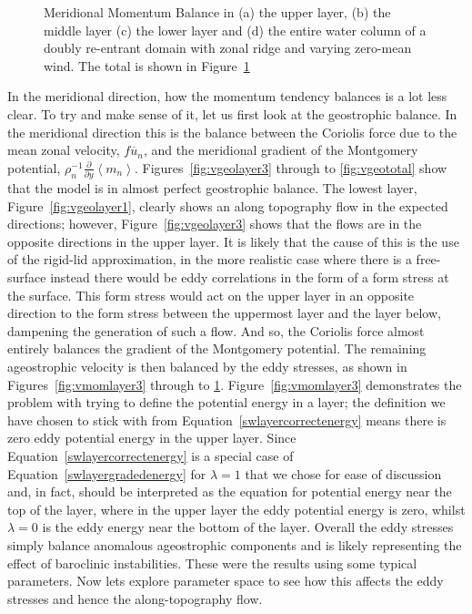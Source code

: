 \documentclass[12pt,a4paper]{report}
\newcommand*\thkmean[1]{\overline{#1}}
\newcommand*\nthkmean[1]{\left\langle{#1}\right\rangle}
\newcommand*\figref[1]{Figure~\ref{#1}}
\newcommand*\equref[1]{Equation~\eqref{#1}}
\newcommand*{\partialdiff}[2][{}]{\frac{\partial #1}{\partial #2}}
\begin{document}
\begin{figure}
\begin{subfigure}{0.48\linewidth}
 		\label{fig:vmomtotal}
 	\end{subfigure}
 	\caption{Meridional Momentum Balance in (a) the upper layer, (b) the middle layer
 		(c) the lower layer and (d) the entire water column of 
 		a doubly re-entrant domain with 
 		zonal ridge and varying zero-mean wind. The total is shown in
 		\figref{fig:vmomtotal}}
 	\label{fig:vmom}
 \end{figure}
 
 In the meridional direction, how the momentum tendency balances is a lot
 less clear. To try and make sense of it, let us first look at
 the geostrophic balance. In the meridional direction this
 is the balance between the Coriolis force due to the mean zonal velocity,
 $f\thkmean{u}_{n}$,
 and the meridional gradient of the Montgomery potential,
 $\rho_{n}^{-1}\partialdiff{y}\nthkmean{m_{n}}$. Figures~\ref{fig:vgeolayer3}
 through to \ref{fig:vgeototal} show that the model is in almost perfect
 geostrophic balance. The lowest layer, \figref{fig:vgeolayer1}, clearly shows
 an along topography flow in the expected directions; however, \figref{fig:vgeolayer3}
 shows that the flows are in the opposite directions in the upper layer. 
 It is likely that the cause of this is the use of the rigid-lid approximation,
 in the more realistic case where there is a free-surface instead there would be
 eddy correlations in the form of a form stress at the surface. This form stress 
 would act on the upper layer in an opposite direction to the form stress 
 between the uppermost layer and the layer below, dampening the generation of 
 such a flow. And so, the Coriolis force almost entirely balances the 
 gradient of the Montgomery potential. The remaining ageostrophic velocity
 is then balanced by the eddy stresses, as shown in Figures~\ref{fig:vmomlayer3}
 through to \ref{fig:vmomtotal}. \figref{fig:vmomlayer3} demonstrates
 the problem with trying to define the potential energy in a layer;
 the definition we have chosen to stick with from \equref{swlayercorrectenergy}
 means there is zero eddy potential energy in the upper layer.
 Since \equref{swlayercorrectenergy} is a special case of \equref{swlayergradedenergy} 
 for $\lambda = 1$ that we chose for ease of discussion and, in fact,
 should be interpreted as the equation for potential energy near the top of the layer,
 where in the upper layer the eddy potential energy is zero, whilst 
 $\lambda = 0$ is the eddy energy near the bottom of the layer.
 Overall the eddy
 stresses simply balance anomalous ageostrophic components and is
 likely representing the effect of baroclinic instabilities.
 These were the results using some typical parameters. Now lets explore parameter space
 to see how this affects the eddy stresses and hence the along-topography flow.
 
\end{document}
